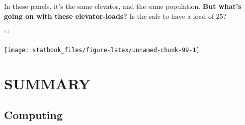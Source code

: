 \documentclass[]{book}
\begin{document}
In these panels, it's the same elevator, and the same population. \textbf{But what's going on with these elevator-loads?} Is the safe to have a load of 25?

```

\begin{center}\texttt{[image: statbook\_files/figure-latex/unnamed-chunk-99-1]} \end{center}

\hypertarget{summary-3}{%
\section{SUMMARY}\label{summary-3}}

\hypertarget{computing-1}{%
\subsection{Computing}\label{computing-1}}
\end{document}
